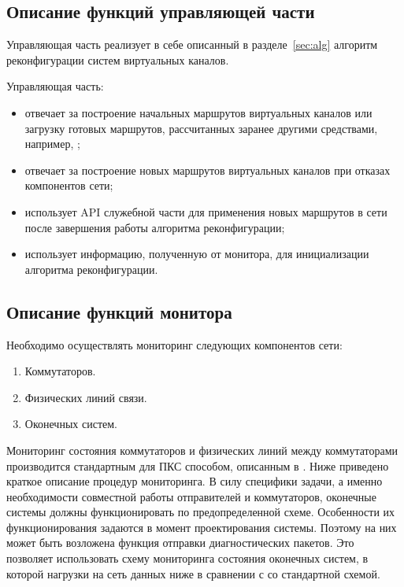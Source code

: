\documentclass[12pt, a4paper]{article}
\begin{document}
\subsection{Описание функций управляющей части}
Управляющая часть реализует в себе описанный в разделе~\ref{sec:alg} алгоритм реконфигурации систем виртуальных каналов.

Управляющая часть:
\begin{itemize}
	\item отвечает за построение начальных маршрутов виртуальных каналов или загрузку готовых маршрутов, рассчитанных заранее другими средствами, например, \cite{vdovin};
	\item отвечает за построение новых маршрутов виртуальных каналов при отказах компонентов сети;
	\item использует API служебной части для применения новых маршрутов в сети после завершения работы алгоритма реконфигурации;
	\item использует информацию, полученную от монитора, для инициализации алгоритма реконфигурации.
\end{itemize}

\subsection{Описание функций монитора} \label{subsec:monitor}

Необходимо осуществлять мониторинг следующих компонентов сети:
\begin{enumerate}
	\item Коммутаторов.
	\item Физических линий связи.
	\item Оконечных систем.
\end{enumerate}

Мониторинг состояния коммутаторов и физических линий между коммутаторами производится стандартным для ПКС способом, описанным в \cite{monitor1, monitor2}. Ниже приведено краткое описание процедур мониторинга. В силу специфики задачи, а именно необходимости совместной работы отправителей и коммутаторов, оконечные системы должны функционировать по предопределенной схеме. Особенности их функционирования задаются в момент проектирования системы. Поэтому на них может быть возложена функция отправки диагностических пакетов. Это позволяет использовать схему мониторинга состояния оконечных систем, в которой нагрузки на сеть данных ниже в сравнении с со стандартной схемой.
\end{document}

